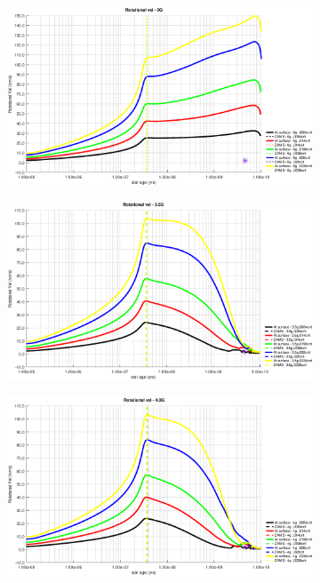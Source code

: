 \documentclass[fleqn,usenatbib]{mnras}
\begin{document}
\begin{figure}
    \centering
    \begin{subfigure}[h]{0.47\textwidth}
    \includegraphics[width=\textwidth]{figures/rot_vel_0g.eps}
    \label{fig:subim41}
    \end{subfigure}
    \begin{subfigure}[h]{0.47\textwidth}
    \includegraphics[width=\textwidth]{figures/rot_vel_3_5g.eps}
    \label{fig:subim42}
    \end{subfigure}
    \begin{subfigure}[h]{0.47\textwidth}
    \includegraphics[width=\textwidth]{figures/rot_vel_4g.eps}

\end{subfigure}
\end{figure}
\end{document}
